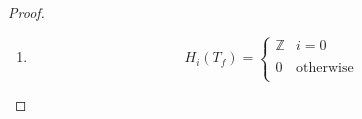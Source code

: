 \documentclass[10pt]{article}
\newcommand{\sk}{\vskip 10mm}
\newcommand{\bb}[1]{\mathbb{#1}}
\theoremstyle{plain}
\theoremstyle{remark}
\begin{document}
\begin{proof}
\begin{enumerate}
\[\begin{array}{cr}
          \bb{Z} & i=0,2,3\\
          0 & \text{otherwise}\\
        \end{array}
      \right.
    \]
  \item[(e)]
    \[
      H_i(T_f) =
      \left\{
        \begin{array}{cr}
          \bb{Z} & i=0\\
                 &\\
          0 & \text{otherwise}\\
        \end{array}
      \right.
    \]
  \end{enumerate}
\end{proof}

\sk

\end{document}
